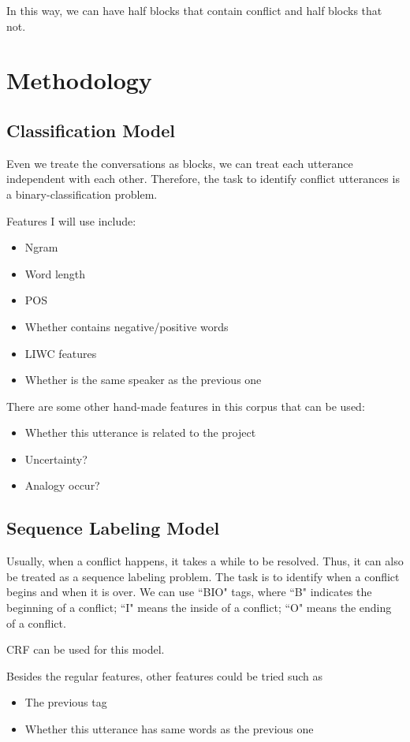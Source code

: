 \documentclass[11pt,letterpaper]{article}
\begin{document}
In this way, we can have half blocks that contain conflict and half blocks that not.

\section{Methodology}

\subsection{Classification Model}
Even we treate the conversations as blocks, we can treat each utterance independent with each other. Therefore, the task to identify conflict utterances is a binary-classification problem.

Features I will use include:

\begin{itemize}
	\item Ngram
	\item Word length
	\item POS
	\item Whether contains negative/positive words
	\item LIWC features
	\item Whether is the same speaker as the previous one
\end{itemize}

There are some other hand-made features in this corpus that can be used:
\begin{itemize}
	\item Whether this utterance is related to the project
	\item Uncertainty?
	\item Analogy occur?
\end{itemize}

\subsection{Sequence Labeling Model}
Usually, when a conflict happens, it takes a while to be resolved. Thus, it can also be treated as a sequence labeling problem. The task is to identify when a conflict begins and when it is over. We can use ``BIO" tags, where ``B" indicates the beginning of a conflict; ``I" means the inside of a conflict; ``O" means the ending of a conflict.

CRF \cite{Lafferty:2001} can be used for this model.

Besides the regular features, other features could be tried such as 
\begin{itemize}
	\item The previous tag
	\item Whether this utterance has same words as the previous one
\end{itemize}
\end{document}
